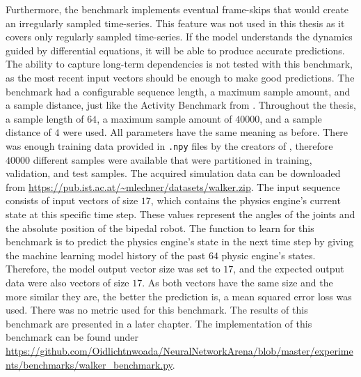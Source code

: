 \documentclass[draft,final]{vutinfth} %
\begin{document}
    Furthermore, the benchmark implements eventual frame-skips that would create an irregularly sampled time-series.
    This feature was not used in this thesis as it covers only regularly sampled time-series.
    If the model understands the dynamics guided by differential equations, it will be able to produce accurate predictions.
    The ability to capture long-term dependencies is not tested with this benchmark, as the most recent input vectors should be enough to make good predictions.
    The benchmark had a configurable sequence length, a maximum sample amount, and a sample distance, just like the Activity Benchmark from .
    Throughout the thesis, a sample length of $64$, a maximum sample amount of $40000$, and a sample distance of $4$ were used.
    All parameters have the same meaning as before.
    There was enough training data provided in \texttt{.npy} files by the creators of \cite{ODELSTM}, therefore $40000$ different samples were available that were partitioned in training, validation, and test samples.
    The acquired simulation data can be downloaded from \url{https://pub.ist.ac.at/~mlechner/datasets/walker.zip}.
    The input sequence consists of input vectors of size $17$, which contains the physics engine's current state at this specific time step.
    These values represent the angles of the joints and the absolute position of the bipedal robot.
    The function to learn for this benchmark is to predict the physics engine's state in the next time step by giving the machine learning model history of the past $64$ physic engine's states.
    Therefore, the model output vector size was set to $17$, and the expected output data were also vectors of size $17$.
    As both vectors have the same size and the more similar they are, the better the prediction is, a mean squared error loss was used.
    There was no metric used for this benchmark.
    The results of this benchmark are presented in a later chapter.
    The implementation of this benchmark can be found under \url{https://github.com/Oidlichtnwoada/NeuralNetworkArena/blob/master/experiments/benchmarks/walker_benchmark.py}.
\end{document}
